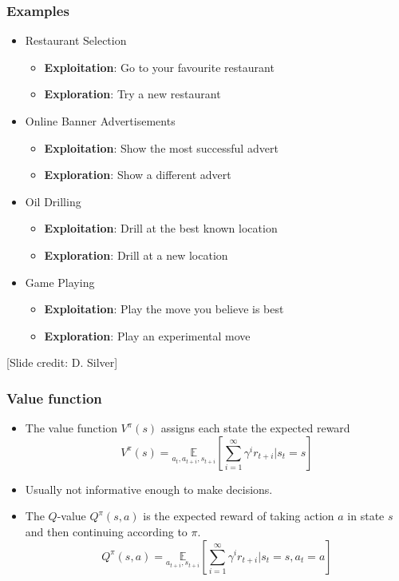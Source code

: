 \documentclass{beamer}
\renewcommand{\high}{\textbf}
\begin{document}
\begin{frame}\frametitle{Examples}\small
\begin{itemize}
\item Restaurant Selection
\begin{itemize}
\item \high{Exploitation}: Go to your favourite restaurant
\item \high{Exploration}: Try a new restaurant
\end{itemize}
\item Online Banner Advertisements
\begin{itemize}
\item \high{Exploitation}: Show the most successful advert
\item \high{Exploration}: Show a different advert
\end{itemize}
\item Oil Drilling
\begin{itemize}
\item \high{Exploitation}: Drill at the best known location
\item \high{Exploration}: Drill at a new location
\end{itemize}
\item Game Playing
\begin{itemize}
\item \high{Exploitation}: Play the move you believe is best
\item \high{Exploration}: Play an experimental move
\end{itemize}
\end{itemize}
\vspace{1mm}
\scriptsize [Slide credit: D. Silver]
\end{frame}

\begin{frame}\frametitle{Value function}\small
\begin{itemize}
\item The value function $V^\pi(s)$ assigns each state the expected reward 
\[
V^\pi(s)=\underset{a_{t},a_{t+i},s_{t+i}}{\mathbb{E}}\left[\sum_{i=1}^\infty\gamma^{i} r_{t+i} |s_t=s\right]
\]
\item Usually not informative enough to make decisions.
\item The $Q$-value $Q^{\pi}(s,a)$ is the expected reward of taking action $a$ in state $s$ and then continuing according to $\pi$.
\[
Q^\pi(s,a)=\underset{a_{t+i},s_{t+i}}{\mathbb{E}}\left[\sum_{i=1}^\infty\gamma^{i} r_{t+i} |s_t=s,a_t=a\right]
\]
\end{itemize}
\end{frame}
\end{document}
